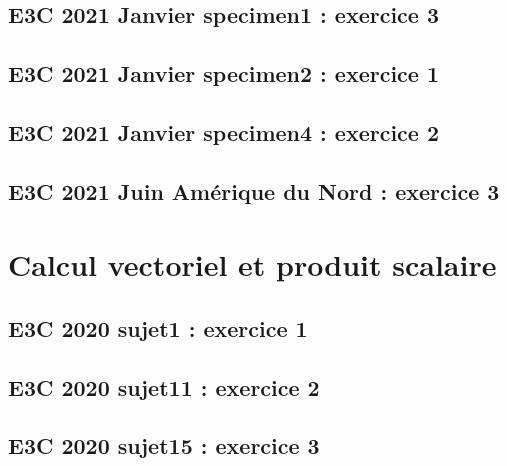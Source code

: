\documentclass[lang=fr,edition=teacher,layout=sheet]{mxbook}
\begin{document}
\par\bigskip
{}\subsection*{E3C 2021 Janvier specimen1 : exercice 3}
\begingroup\endgroup
\par\bigskip
{}\subsection*{E3C 2021 Janvier specimen2 : exercice 1}
\begingroup\endgroup
\par\bigskip
{}\subsection*{E3C 2021 Janvier specimen4 : exercice 2}
\begingroup\endgroup
\par\bigskip
{}\subsection*{E3C 2021 Juin Amérique du Nord : exercice 3}
\begingroup\endgroup
\par\bigskip
\clearpage\section*{Calcul vectoriel et produit scalaire}
\subsection*{E3C 2020 sujet1 : exercice 1}
\begingroup\endgroup
\par\bigskip
{}\subsection*{E3C 2020 sujet11 : exercice 2}
\begingroup\endgroup
\par\bigskip
{}\subsection*{E3C 2020 sujet15 : exercice 3}
\end{document}
